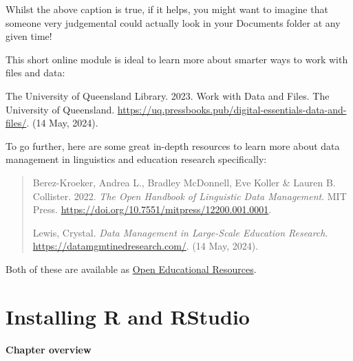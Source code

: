 \documentclass[
  letterpaper,
  DIV=11,
  numbers=noendperiod]{scrreprt}
\begin{document}
Whilst the above caption is true, if it helps, you might want to imagine
that someone very judgemental could actually look in your Documents
folder at any given time!

\begin{tcolorbox}[enhanced jigsaw, opacityback=0, bottomrule=.15mm, left=2mm, coltitle=black, bottomtitle=1mm, opacitybacktitle=0.6, leftrule=.75mm, arc=.35mm, breakable, toptitle=1mm, colframe=quarto-callout-note-color-frame, colback=white, titlerule=0mm, colbacktitle=quarto-callout-note-color!10!white, title=\textcolor{quarto-callout-note-color}{\faInfo}\hspace{0.5em}{Going further}, rightrule=.15mm, toprule=.15mm]

This short online module is ideal to learn more about smarter ways to
work with files and data:

The University of Queensland Library. 2023. Work with Data and Files.
The University of Queensland.
\url{https://uq.pressbooks.pub/digital-essentials-data-and-files/}. (14
May, 2024).

To go further, here are some great in-depth resources to learn more
about data management in linguistics and education research
specifically:

\begin{quote}
Berez-Kroeker, Andrea L., Bradley McDonnell, Eve Koller \& Lauren B.
Collister. 2022. \emph{The Open Handbook of Linguistic Data Management}.
MIT Press. \url{https://doi.org/10.7551/mitpress/12200.001.0001}.

Lewis, Crystal. \emph{Data Management in Large-Scale Education
Research}. \url{https://datamgmtinedresearch.com/}. (14 May, 2024).
\end{quote}

Both of these are available as
\href{https://elenlefoll.github.io/RstatsTextbook/OpenScholarship.html\#open-education}{Open
Educational Resources}.

\end{tcolorbox}


\chapter{Installing R and RStudio}\label{installing-r-and-rstudio}

\subsubsection*{\texorpdfstring{\textbf{Chapter
overview}}{Chapter overview}}\label{chapter-overview}
\end{document}
